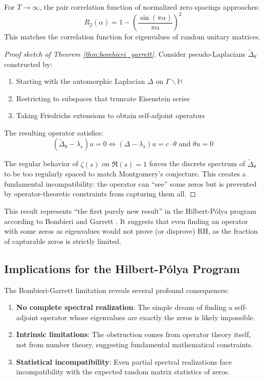 \begin{conjecture}
For $T \to \infty$, the pair correlation function of normalized zero spacings approaches:
$$R_2(\alpha) = 1 - \left(\frac{\sin(\pi \alpha)}{\pi \alpha}\right)^2$$
This matches the correlation function for eigenvalues of random unitary matrices.
\end{conjecture}

\begin{proof}[Proof sketch of Theorem \ref{thm:bombieri_garrett}]
Consider pseudo-Laplacians $\tilde{\Delta}_\theta$ constructed by:
\begin{enumerate}
\item Starting with the automorphic Laplacian $\Delta$ on $\Gamma \backslash \mathbb{H}$
\item Restricting to subspaces that truncate Eisenstein series
\item Taking Friedrichs extensions to obtain self-adjoint operators
\end{enumerate}

The resulting operator satisfies:
$$(\tilde{\Delta}_\theta - \lambda_s)u = 0 \iff (\Delta - \lambda_s)u = c \cdot \theta \text{ and } \theta u = 0$$

The regular behavior of $\zeta(s)$ on $\Re(s) = 1$ forces the discrete spectrum of $\tilde{\Delta}_\theta$ to be too regularly spaced to match Montgomery's conjecture. This creates a fundamental incompatibility: the operator can ``see'' some zeros but is prevented by operator-theoretic constraints from capturing them all.
\end{proof}

\begin{remark}
This result represents ``the first purely new result'' in the Hilbert-P\'olya program according to Bombieri and Garrett \cite{bombieri1995}. It suggests that even finding an operator with some zeros as eigenvalues would not prove (or disprove) RH, as the fraction of capturable zeros is strictly limited.
\end{remark}

\subsection{Implications for the Hilbert-P\'olya Program}

The Bombieri-Garrett limitation reveals several profound consequences:

\begin{enumerate}
\item \textbf{No complete spectral realization}: The simple dream of finding a self-adjoint operator whose eigenvalues are exactly the zeros is likely impossible.

\item \textbf{Intrinsic limitations}: The obstruction comes from operator theory itself, not from number theory, suggesting fundamental mathematical constraints.

\item \textbf{Statistical incompatibility}: Even partial spectral realizations face incompatibility with the expected random matrix statistics of zeros.
\end{enumerate}

